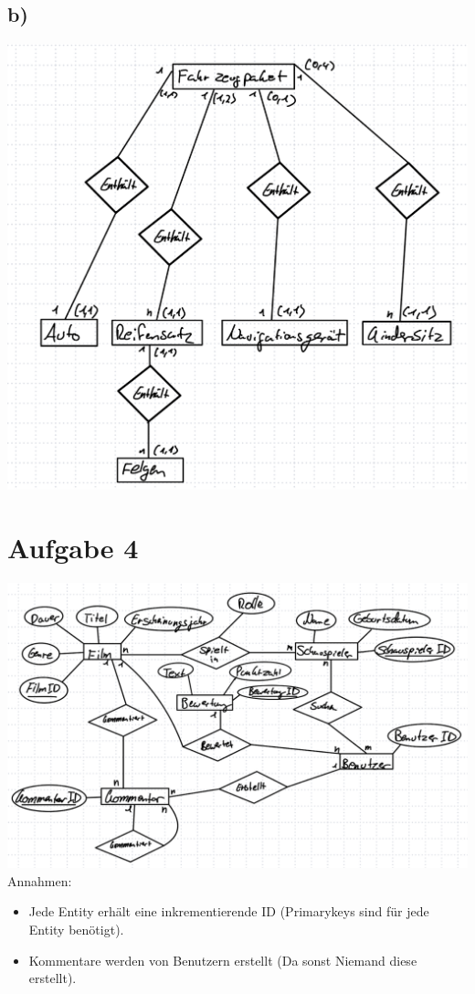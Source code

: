 \documentclass[12pt,german,a4paper]{article}
\begin{document}
\subsection*{b)}
\includegraphics[width=\linewidth]{./img/aufgabe3b.png}
\section*{Aufgabe 4}
\includegraphics[width=\linewidth]{./img/aufgabe4.png}
Annahmen:
\begin{itemize}
\item Jede Entity erhält eine inkrementierende ID (Primarykeys sind für jede Entity benötigt).
\item Kommentare werden von Benutzern erstellt (Da sonst Niemand diese erstellt).
\end{itemize}
\end{document}
